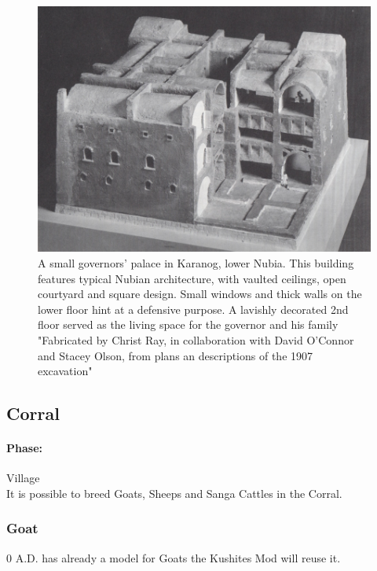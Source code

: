 \documentclass[a4paper,12pt]{scrreprt}
\begin{document}
\begin{figure}[H]
	\centering
	\includegraphics[width=\textwidth]{img/civic_center/governor_palace_karanog}
	\caption{A small governors' palace in Karanog, lower Nubia. This building features typical Nubian architecture, with vaulted ceilings, open courtyard and square design. Small windows and thick walls on the lower floor hint at a defensive purpose. A lavishly decorated 2nd floor served as the living space for the governor and his family "Fabricated by Christ Ray, in collaboration with David O'Connor and Stacey Olson, from plans an descriptions of the 1907 excavation"}\label{fig:karanog_governor_palace}
\end{figure}

\subsection{Corral}

\paragraph{Phase:} Village\\

It is possible to breed Goats, Sheeps and Sanga Cattles in the Corral.


\subsubsection{Goat}

0 A.D. has already a model for Goats the Kushites Mod will reuse it.
\end{document}
